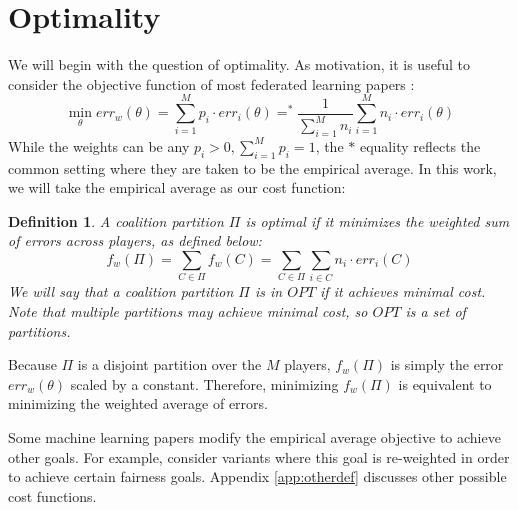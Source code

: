 \documentclass{article}
\newcommand{\p}[1]{\left( #1 \right)}
\newcommand{\cd}[0]{\cdot}
\newtheorem{definition}{Definition}
\newcommand{\nplayer}[0]{\ensuremath{M}}
\newcommand{\mean}[0]{\ensuremath{\theta}}
\newcommand{\ndraw}[0]{\ensuremath{n}}
\newcommand{\col}[0]{\ensuremath{C}}
\newcommand{\costw}[0]{\ensuremath{f_w}}
\newcommand{\partition}[0]{\ensuremath{\Pi}}
\begin{document}
\section{Optimality}\label{sec:opt}
We will begin with the question of optimality. As motivation, it is useful to consider the objective function of most federated learning papers \cite{mcmahan2016communicationefficient}: 
\begin{equation*}
    \min_\mean err_w(\mean) = \sum_{i=1}^{\nplayer}p_i \cd err_i(\mean) =^* \frac{1}{\sum_{i=1}^{\nplayer}\ndraw_i}\sum_{i=1}^{\nplayer}\ndraw_i\cd err_i(\mean)
\end{equation*}
While the weights can be any $p_i > 0, \sum_{i=1}^{\nplayer}p_i=1$, the $*$ equality reflects the common setting where they are taken to be the empirical average. In this work, we will take the empirical average as our cost function: 
\begin{definition}\label{def:opt}
A coalition partition $\partition$ is optimal if it minimizes the weighted sum of errors across players, as defined below: 
$$\costw(\Pi) = \sum_{\col \in \partition}\costw(\col) = \sum_{\col \in \partition}\sum_{i \in \col}\ndraw_i \cd err_{i}(\col)$$
We will say that a coalition partition $\partition$ is in $OPT$ if it achieves minimal cost. Note that multiple partitions may achieve minimal cost, so $OPT$ is a set of partitions. 
\end{definition}
Because $\partition$ is a disjoint partition over the $\nplayer$ players, $\costw(\partition)$ is simply the error $err_w(\mean)$ scaled by a constant. Therefore, minimizing $\costw(\partition)$ is equivalent to minimizing the weighted average of errors.


 
Some machine learning papers modify the empirical average objective to achieve other goals. For example, \citet{li2019fair, mohri2019agnostic} consider variants where this goal is re-weighted in order to achieve certain fairness goals. Appendix \ref{app:otherdef} discusses other possible cost functions. 
\end{document}
